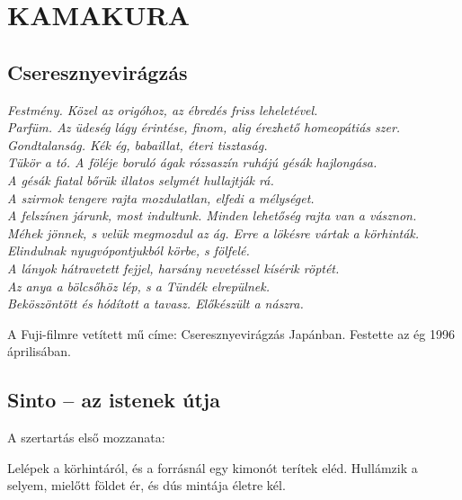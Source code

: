 \clearpage
\chapter{KAMAKURA}

\section{Cseresznyevirágzás}

\begin{LVerse}\itshape
Festmény. Közel az origóhoz, az ébredés friss leheletével.		\\
Parfüm. Az üdeség lágy érintése, finom, alig érezhető homeopátiás szer.	\\
Gondtalanság. Kék ég, babaillat, éteri tisztaság.			\\
Tükör a tó. A föléje boruló ágak rózsaszín ruhájú gésák hajlongása.	\\
A gésák fiatal bőrük illatos selymét hullajtják rá.			\\
A szirmok tengere rajta mozdulatlan, elfedi a mélységet.		\\
A felszínen járunk, most indultunk. Minden lehetőség rajta van a vásznon. \\
Méhek jönnek, s velük megmozdul az ág. Erre a lökésre vártak a körhinták. \\
Elindulnak nyugvópontjukból körbe, s fölfelé.				\\
A lányok hátravetett fejjel, harsány nevetéssel kísérik röptét.		\\
Az anya a bölcsőhöz lép, s a Tündék elrepülnek.				\\
Beköszöntött és hódított a tavasz. Előkészült a nászra.
\end{LVerse}

\bigskip
\begin{itshape}\otherfamily
A Fuji-filmre vetített mű címe: \textup{Cseresznyevirágzás Japánban}.
Festette az ég 1996 áprilisában.
\end{itshape}
\vfill


\section{Sinto -- az istenek útja}

A szertartás első mozzanata:

Lelépek a körhintáról, és a forrásnál egy kimonót terítek eléd. Hullámzik
a selyem, mielőtt földet ér, és dús mintája életre kél.

